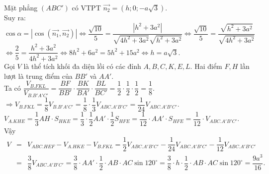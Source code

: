 \begin{ex}
{		Mặt phẳng $\left( ABC' \right)$ có VTPT $\overrightarrow{n_2}=\left( h;0;-a\sqrt{3} \right)$.\\
		Suy ra: $\cos \alpha =\left| \cos \left( \overrightarrow{n_1},\overrightarrow{n_2} \right) \right|\Leftrightarrow \dfrac{\sqrt{10}}{5}=\dfrac{\left| {h^2}+3a^2 \right|}{\sqrt{4h^2+3a^2}\sqrt{h^2+3a^2}}\Leftrightarrow \dfrac{\sqrt{10}}{5}=\dfrac{\sqrt{h^2+3a^2}}{\sqrt{4h^2+3a^2}}$\\
		$\Leftrightarrow \dfrac{2}{5}=\dfrac{h^2+3a^2}{4h^2+3a^2}\Leftrightarrow 8h^2+6a^2=5h^2+15a^2\Leftrightarrow h=a\sqrt{3}$.\\
		Gọi $V$ là thể tích khối đa diện lồi có các đỉnh $A,B,C,K,E,L$. Hai điểm $F,H$ lần lượt là trung điểm của $BB'$ và $AA'$.\\
		Ta có $\dfrac{{V_{B.FKL}}}{{V_{B.B'A'C'}}}=\dfrac{BF}{BB'}\cdot\dfrac{BK}{BA'}\cdot\dfrac{BL}{BC'}=\dfrac{1}{2}\cdot\dfrac{1}{2}\cdot\dfrac{1}{2}=\dfrac{1}{8}$.\\
		$\Rightarrow {V_{B.FKL}}=\dfrac{1}{8}{V_{B.B'A'C'}}=\dfrac{1}{8}\cdot\dfrac{1}{3}{V_{ABC.A'B'C'}}=\dfrac{1}{24}{V_{ABC.A'B'C'}}$.\\
		${V_{A.KHE}}=\dfrac{1}{3}AH\cdot{S_{HKE}}=\dfrac{1}{3}\cdot\dfrac{1}{2}AA'\cdot\dfrac{1}{2}{S_{HFE}}=\dfrac{1}{12}\cdot AA'\cdot{S_{HFE}}=\dfrac{1}{12}\cdot {V_{ABC.A'B'C'}}$.\\
		Vậy
		\begin{eqnarray*}
			V
			&=& {V_{ABC.HEF}}-{V_{A.HKE}}-{V_{B.FKL}}=\dfrac{1}{2}{V_{ABC.A'B'C'}}-\dfrac{1}{24}{V_{ABC.A'B'C'}}-\dfrac{1}{12}{V_{ABC.A'B'C'}}\\
			&=& \dfrac{3}{8}{V_{ABC.A'B'C'}}=\dfrac{3}{8}\cdot AA'\cdot\dfrac{1}{2}\cdot AB\cdot AC\sin 120^{\circ} =\dfrac{3}{8}\cdot h\cdot\dfrac{1}{2}\cdot AB\cdot AC\sin 120^{\circ} =\dfrac{9a^3}{16}.
		\end{eqnarray*}
	}
\end{ex}
